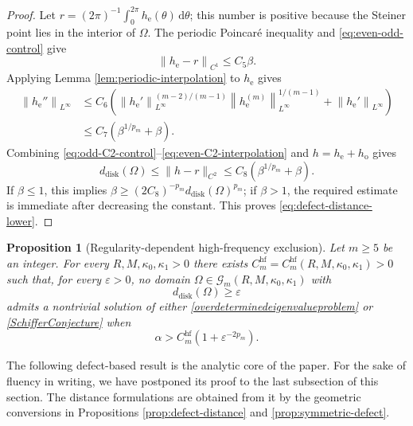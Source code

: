 \documentclass[12pt]{article}
\numberwithin{equation}{section}
\newtheorem{proposition}[theorem]{Proposition}
\numberwithin{equation}{section}
\newcommand{\cG}{\mathcal{G}}
\begin{document}
\begin{proof}
Let $r=(2\pi)^{-1}\int_0^{2\pi}h_{\mathrm{e}}(\theta)\,\mathrm{d}\theta$; this number is
positive because the Steiner point lies in the interior of $\Omega$.
The periodic Poincar\'e inequality and \eqref{eq:even-odd-control} give
\begin{equation*}\label{eq:even-C1-control}
 \left\|h_{\mathrm{e}}-r\right\|_{C^1}\leq C_5\beta.
\end{equation*}
Applying Lemma \ref{lem:periodic-interpolation} to $h_{\mathrm{e}}$ gives
\begin{align}
 \left\|h_{\mathrm{e}}''\right\|_{L^\infty}
 &\leq C_6\left(
 \left\|h_{\mathrm{e}}'\right\|_{L^\infty}^{(m-2)/(m-1)}
 \left\|h_{\mathrm{e}}^{(m)}\right\|_{L^\infty}^{1/(m-1)}
 +\left\|h_{\mathrm{e}}'\right\|_{L^\infty}\right)\nonumber\\
 &\leq C_7\left(\beta^{1/p_m}+\beta\right).
 \label{eq:even-C2-interpolation}
\end{align}
Combining \eqref{eq:odd-C2-control}--\eqref{eq:even-C2-interpolation} and $h=h_{\mathrm{e}}+h_{\mathrm{o}}$ gives
\begin{equation*}\label{eq:distance-upper-by-defect}
 d_{\mathrm{disk}}(\Omega)
 \leq\|h-r\|_{C^2}
 \leq C_8\left(\beta^{1/p_m}+\beta\right).
\end{equation*}
If $\beta\leq1$, this implies
$\beta\geq\left(2C_8\right)^{-p_m}d_{\mathrm{disk}}(\Omega)^{p_m}$; if
$\beta>1$, the required estimate is immediate after decreasing the
constant. This proves \eqref{eq:defect-distance-lower}.
\end{proof}

\begin{proposition}[Regularity-dependent high-frequency exclusion]
\label{thm:main-distance}
Let $m\geq5$ be an integer. For every $R,M,\kappa_0,\kappa_1>0$ there
exists $C_m^{\mathrm{hf}}=C_m^{\mathrm{hf}}\left(R,M,\kappa_0,\kappa_1\right)>0$ such that, for
every $\varepsilon>0$, no domain
$\Omega\in\cG_m\left(R,M,\kappa_0,\kappa_1\right)$ with
\[
 d_{\mathrm{disk}}(\Omega)\geq\varepsilon
\]
admits a nontrivial solution of either \eqref{overdeterminedeigenvalueproblem} or \eqref{SchifferConjecture} when
\begin{equation}\label{eq:epsilon-threshold}
 \alpha>C_m^{\mathrm{hf}}\left(1+\varepsilon^{-2p_m}\right).
\end{equation}
\end{proposition}

The following defect-based result is the analytic core of the paper. For the sake of fluency in writing, we have postponed its proof to the last subsection of this section. The
distance formulations are obtained from it by the geometric conversions in
Propositions \ref{prop:defect-distance} and \ref{prop:symmetric-defect}.
\end{document}
